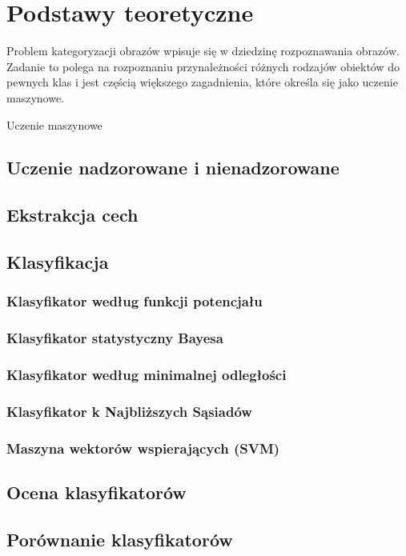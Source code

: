 \chapter{Podstawy teoretyczne}

Problem kategoryzacji obrazów wpisuje się w dziedzinę rozpoznawania obrazów. Zadanie to polega na rozpoznaniu przynależności różnych rodzajów obiektów do pewnych klas\cite{Tad91} i jest częścią większego zagadnienia, które określa się jako uczenie maszynowe.

Uczenie maszynowe 



\section{Uczenie nadzorowane i nienadzorowane}


\section{Ekstrakcja cech}

\section{Klasyfikacja}

	\subsection{Klasyfikator według funkcji potencjału}
	
	\subsection{Klasyfikator statystyczny Bayesa}
	
	\subsection{Klasyfikator według minimalnej odległości}
	
	\subsection{Klasyfikator k Najbliższych Sąsiadów}

	\subsection{Maszyna wektorów wspierających (SVM)}
	
\section{Ocena klasyfikatorów}

\section{Porównanie klasyfikatorów}
